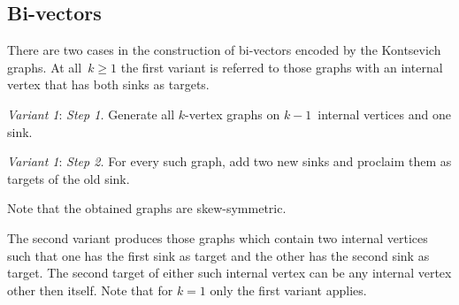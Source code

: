 \documentclass[a4paper]{jpconf}%
\theoremstyle{definition}
\theoremstyle{remark}
\begin{document}


\subsection{\textbf{Bi\/-\/vectors}}
There are two cases in the construction of bi\/-\/vectors encoded by the
Kontsevich graphs. At all~$k\geqslant1$ the first variant is referred to
those graphs with an internal vertex that has both sinks as targets.

\smallskip\noindent%
{\textit{Variant 1}: \textit{Step 1.}} Generate all $k$-vertex graphs on
$k-1$~internal vertices and one sink.

\noindent%
{\textit{Variant 1}: \textit{Step 2.}} For every such graph, 
add two new sinks and proclaim them as targets of the old sink.

Note that the obtained graphs are skew\/-\/symmetric. %

\smallskip
The second variant produces those graphs which contain two internal vertices such that 
one has the first sink as target and the other has the second sink as target.
The second target of either such internal vertex can be any internal vertex other then itself. Note that for $k = 1$ only %
the first variant applies.
\end{document}
